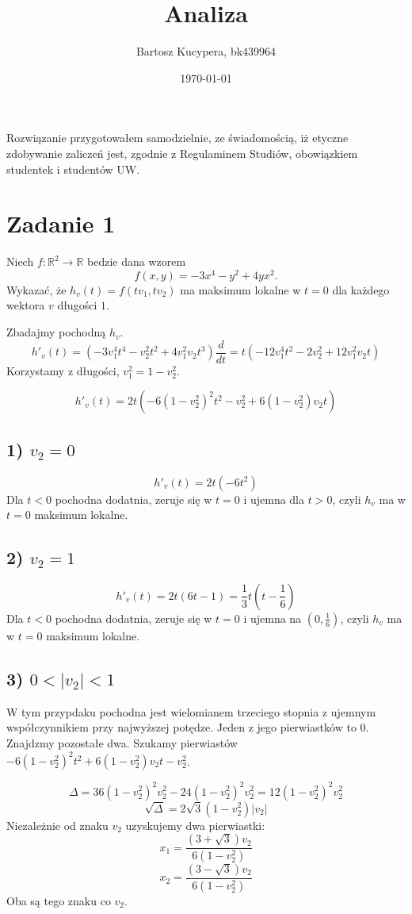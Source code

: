 \documentclass{article}
\title{Analiza}
\author{Bartosz Kucypera, bk439964}
\date{\today}
\def\vv{v_2^2}
\begin{document}
\maketitle

Rozwiązanie przygotowałem samodzielnie, ze świadomością, iż etyczne zdobywanie zaliczeń jest, zgodnie z Regulaminem Studiów, obowiązkiem studentek i studentów UW.

\section*{Zadanie 1}
Niech $f:\mathbb{R}^2 \to \mathbb{R}$ bedzie dana wzorem
$$f(x,y)=-3x^4-y^2+4yx^2.$$
Wykazać, że $h_v(t) = f(tv_1,tv_2)$ ma maksimum lokalne w $t=0$ dla każdego wektora $v$ długości $1$.

Zbadajmy pochodną $h_v$.
$$h'_v(t) = \left(-3v_1^4t^4-v_2^2t^2+4v_1^2v_2t^3 \right)\frac{d}{dt} = 
t(-12v_1^4t^2-2v_2^2+12v_1^2v_2t)$$
Korzystamy z długości, $ v_1^2 = 1-v_2^2 $.

$$h'_v(t) = 2t(-6(1-v_2^2)^2t^2-v_2^2+6(1-v_2^2)v_2t) $$
\subsection*{1) $v_2=0$}
$$h'_v(t) = 2t(-6t^2) $$
Dla $t<0$ pochodna dodatnia, zeruje się w $t=0$ i ujemna dla $t>0$, czyli $h_v$ ma w $t=0$ maksimum lokalne.
\subsection*{2) $v_2=1$}

$$h'_v(t) = 2t(6t-1)= \frac{1}{3}t(t-\frac{1}{6}) $$
Dla $t<0$ pochodna dodatnia, zeruje się w $t=0$ i ujemna na $(0,\frac{1}{6})$, czyli $h_v$ ma w $t=0$ maksimum lokalne.

\subsection*{3) $0<|v_2|<1$}
W tym przypdaku pochodna jest wielomianem trzeciego stopnia z ujemnym współczynnikiem przy najwyższej potędze. Jeden z jego pierwiastków to 0. Znajdzmy pozostałe dwa. \newline 
Szukamy pierwiastów $-6(1-v_2^2)^2t^2 + 6(1-v_2^2)v_2t -v_2^2$.


$$ \Delta = 36(1-\vv)^2\vv -24(1-\vv)^2\vv = 12(1-\vv)^2\vv $$
$$\sqrt{\Delta} = 2\sqrt{3}(1-v_2^2)|v_2|$$
Niezależnie od znaku $v_2$ uzyskujemy dwa pierwiastki:
$$ x_1 = \frac{(3+\sqrt{3})v_2}{6(1-\vv)} $$
$$ x_2 = \frac{(3-\sqrt{3})v_2}{6(1-\vv)} $$
Oba są tego znaku co $v_2$.
\end{document}
